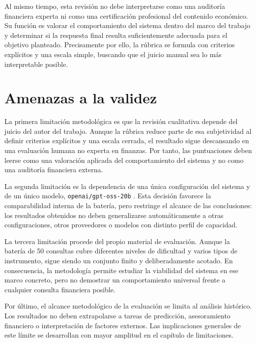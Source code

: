 Al mismo tiempo, esta revisi\'on no debe interpretarse como una auditor\'ia financiera experta ni como una certificaci\'on profesional del contenido
econ\'omico. Su funci\'on es valorar el comportamiento del sistema dentro del marco del trabajo y determinar si la respuesta final resulta suficientemente
adecuada para el objetivo planteado. Precisamente por ello, la r\'ubrica se formula con criterios expl\'icitos y una escala simple, buscando que el juicio
manual sea lo m\'as interpretable posible.

\section{Amenazas a la validez}

La primera limitaci\'on metodol\'ogica es que la revisi\'on cualitativa depende del juicio del autor del trabajo. Aunque la r\'ubrica reduce parte de esa
subjetividad al definir criterios expl\'icitos y una escala cerrada, el resultado sigue descansando en una evaluaci\'on humana no experta en finanzas.
Por tanto, las puntuaciones deben leerse como una valoraci\'on aplicada del comportamiento del sistema y no como una auditor\'ia financiera externa.

La segunda limitaci\'on es la dependencia de una \'unica configuraci\'on del sistema y de un \'unico modelo, \texttt{openai/gpt-oss-20b}
\cite{openai2025gptossmodelcard}. Esta decisi\'on favorece la comparabilidad interna de la bater\'ia, pero restringe el alcance de las conclusiones: los
resultados obtenidos no deben generalizarse autom\'aticamente a otras configuraciones, otros proveedores o modelos con distinto perfil de capacidad.

La tercera limitaci\'on procede del propio material de evaluaci\'on. Aunque la bater\'ia de 50 consultas cubre diferentes niveles de dificultad y varios tipos
de instrumento, sigue siendo un conjunto finito y deliberadamente acotado. En consecuencia, la metodolog\'ia permite estudiar la viabilidad del sistema en ese
marco concreto, pero no demostrar un comportamiento universal frente a cualquier consulta financiera posible.

Por \'ultimo, el alcance metodol\'ogico de la evaluaci\'on se limita al an\'alisis hist\'orico. Los resultados no deben extrapolarse a tareas de predicci\'on, 
asesoramiento financiero o interpretaci\'on de factores externos. Las implicaciones generales de este l\'imite se desarrollan con mayor amplitud en el cap\'itulo de limitaciones.
